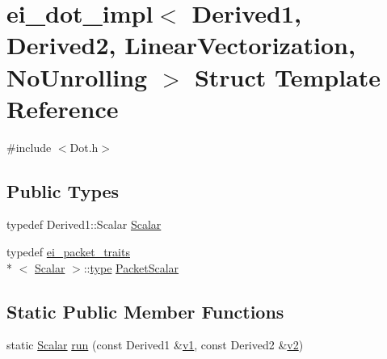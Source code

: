 \hypertarget{structei__dot__impl_3_01_derived1_00_01_derived2_00_01_linear_vectorization_00_01_no_unrolling_01_4}{\section{ei\-\_\-dot\-\_\-impl$<$ Derived1, Derived2, Linear\-Vectorization, No\-Unrolling $>$ Struct Template Reference}
\label{structei__dot__impl_3_01_derived1_00_01_derived2_00_01_linear_vectorization_00_01_no_unrolling_01_4}
}


{\ttfamily \#include $<$Dot.\-h$>$}

\subsection*{Public Types}
\begin{DoxyCompactItemize}
\item 
typedef Derived1\-::\-Scalar \hyperlink{structei__dot__impl_3_01_derived1_00_01_derived2_00_01_linear_vectorization_00_01_no_unrolling_01_4_aa59256107f5fdd82e36a0a9e3bcb199b}{Scalar}
\item 
typedef \hyperlink{structei__packet__traits}{ei\-\_\-packet\-\_\-traits}\\*
$<$ \hyperlink{structei__dot__impl_3_01_derived1_00_01_derived2_00_01_linear_vectorization_00_01_no_unrolling_01_4_aa59256107f5fdd82e36a0a9e3bcb199b}{Scalar} $>$\-::\hyperlink{glext_8h_a7d05960f4f1c1b11f3177dc963a45d86}{type} \hyperlink{structei__dot__impl_3_01_derived1_00_01_derived2_00_01_linear_vectorization_00_01_no_unrolling_01_4_aceef518270c80f1a170db132bd2c0122}{Packet\-Scalar}
\end{DoxyCompactItemize}
\subsection*{Static Public Member Functions}
\begin{DoxyCompactItemize}
\item 
static \hyperlink{structei__dot__impl_3_01_derived1_00_01_derived2_00_01_linear_vectorization_00_01_no_unrolling_01_4_aa59256107f5fdd82e36a0a9e3bcb199b}{Scalar} \hyperlink{structei__dot__impl_3_01_derived1_00_01_derived2_00_01_linear_vectorization_00_01_no_unrolling_01_4_ad38dcd9908c4e68e00a3b5e73ee3d657}{run} (const Derived1 \&\hyperlink{glext_8h_aabdd9aabede45fcf97cea04f88d2ad60}{v1}, const Derived2 \&\hyperlink{glext_8h_ae35401c8c2fcdcc48c20ba325ee473ea}{v2})
\end{DoxyCompactItemize}


